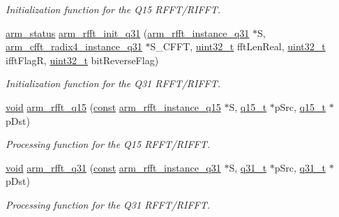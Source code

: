 \begin{DoxyCompactItemize}
\begin{DoxyCompactList}\small\item\em Initialization function for the Q15 R\-F\-F\-T/\-R\-I\-F\-F\-T. \end{DoxyCompactList}\item 
\hyperlink{arm__math_8h_a5e459c6409dfcd2927bb8a57491d7cf6}{arm\-\_\-status} \hyperlink{group___r_f_f_t___r_i_f_f_t_ga8b9c7f99f3c368c82048cd1899acbbd5}{arm\-\_\-rfft\-\_\-init\-\_\-q31} (\hyperlink{structarm__rfft__instance__q31}{arm\-\_\-rfft\-\_\-instance\-\_\-q31} $\ast$S, \hyperlink{structarm__cfft__radix4__instance__q31}{arm\-\_\-cfft\-\_\-radix4\-\_\-instance\-\_\-q31} $\ast$S\-\_\-\-C\-F\-F\-T, \hyperlink{stdint_8h_a435d1572bf3f880d55459d9805097f62}{uint32\-\_\-t} fft\-Len\-Real, \hyperlink{stdint_8h_a435d1572bf3f880d55459d9805097f62}{uint32\-\_\-t} ifft\-Flag\-R, \hyperlink{stdint_8h_a435d1572bf3f880d55459d9805097f62}{uint32\-\_\-t} bit\-Reverse\-Flag)
\begin{DoxyCompactList}\small\item\em Initialization function for the Q31 R\-F\-F\-T/\-R\-I\-F\-F\-T. \end{DoxyCompactList}\item 
\hyperlink{group___n_a_m_e_ga18028b8badbf1ea7e704ccac3c488e82}{void} \hyperlink{group___r_f_f_t___r_i_f_f_t_ga00e615f5db21736ad5b27fb6146f3fc5}{arm\-\_\-rfft\-\_\-q15} (\hyperlink{group___n_a_m_e_ga7ae6d0e43244213b34de2c2b9aa30da6}{const} \hyperlink{structarm__rfft__instance__q15}{arm\-\_\-rfft\-\_\-instance\-\_\-q15} $\ast$S, \hyperlink{arm__math_8h_ab5a8fb21a5b3b983d5f54f31614052ea}{q15\-\_\-t} $\ast$p\-Src, \hyperlink{arm__math_8h_ab5a8fb21a5b3b983d5f54f31614052ea}{q15\-\_\-t} $\ast$p\-Dst)
\begin{DoxyCompactList}\small\item\em Processing function for the Q15 R\-F\-F\-T/\-R\-I\-F\-F\-T. \end{DoxyCompactList}\item 
\hyperlink{group___n_a_m_e_ga18028b8badbf1ea7e704ccac3c488e82}{void} \hyperlink{group___r_f_f_t___r_i_f_f_t_gabaeab5646aeea9844e6d42ca8c73fe3a}{arm\-\_\-rfft\-\_\-q31} (\hyperlink{group___n_a_m_e_ga7ae6d0e43244213b34de2c2b9aa30da6}{const} \hyperlink{structarm__rfft__instance__q31}{arm\-\_\-rfft\-\_\-instance\-\_\-q31} $\ast$S, \hyperlink{arm__math_8h_adc89a3547f5324b7b3b95adec3806bc0}{q31\-\_\-t} $\ast$p\-Src, \hyperlink{arm__math_8h_adc89a3547f5324b7b3b95adec3806bc0}{q31\-\_\-t} $\ast$p\-Dst)
\begin{DoxyCompactList}\small\item\em Processing function for the Q31 R\-F\-F\-T/\-R\-I\-F\-F\-T. \end{DoxyCompactList}\end{DoxyCompactItemize}


